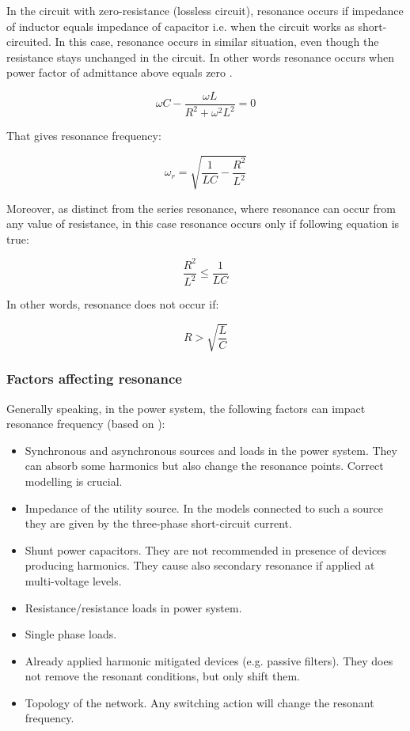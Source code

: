 \documentclass[12pt]{report} %
\begin{document}
In the circuit with zero-resistance (lossless circuit), resonance occurs if impedance of inductor equals impedance of capacitor i.e. when the circuit works as short-circuited. In this case, resonance occurs in similar situation, even though the resistance stays unchanged in the circuit. In other words resonance occurs when power factor of admittance above equals zero \cite{das}.

\begin{equation}
	\omega C-\dfrac{\omega L}{R^2+\omega^2L^2}=0
\end{equation}

That gives resonance frequency:

\begin{equation}
	\omega_r=\sqrt{\dfrac{1}{LC}-\dfrac{R^2}{L^2}}
\end{equation}

Moreover, as distinct from the series resonance, where resonance can occur from any value of resistance, in this case resonance occurs only if following equation is true:

\begin{equation}
	\dfrac{R^2}{L^2}\leq \frac{1}{LC}
\end{equation}

In other words, resonance does not occur if:

\begin{equation}
	R>\sqrt{\dfrac{L}{C}}
\end{equation}

\subsubsection{Factors affecting resonance}
Generally speaking, in the power system, the following factors can impact resonance frequency (based on \cite{das}):
\begin{itemize}
	\item Synchronous and asynchronous sources and loads in the power system. They can absorb some  harmonics but also change the resonance points. Correct modelling is crucial.
	\item Impedance of the utility source. In the models connected to such a source they are given by the three-phase short-circuit current.
	\item Shunt power capacitors. They are not recommended in presence of devices producing harmonics. They cause also secondary resonance if applied at multi-voltage levels.
	\item Resistance/resistance loads in power system.
	\item Single phase loads.
	\item Already applied harmonic mitigated devices (e.g. passive filters). They does not remove the resonant conditions, but only shift them.
	\item Topology of the network. Any switching action will change the resonant frequency.
\end{itemize}
\end{document}
